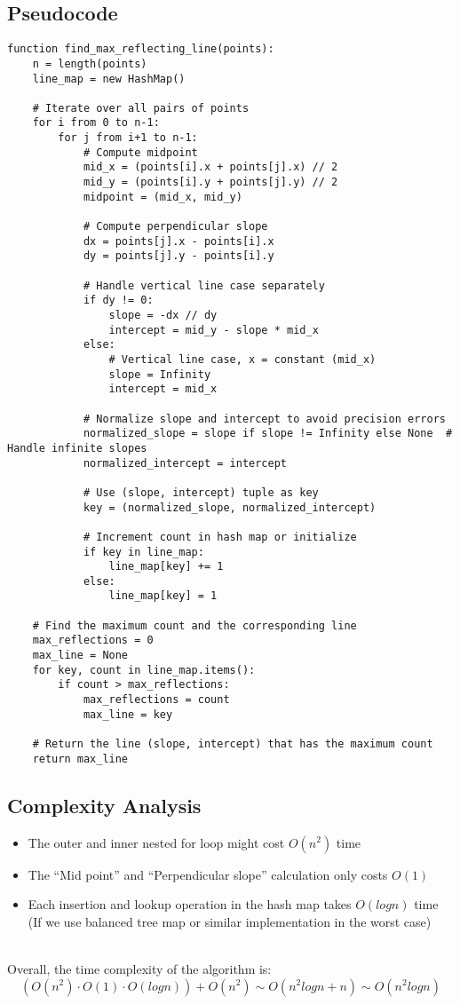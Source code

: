 \documentclass{article}
\begin{document}
\subsection*{Pseudocode}
\begin{verbatim}
function find_max_reflecting_line(points):
    n = length(points)
    line_map = new HashMap()

    # Iterate over all pairs of points
    for i from 0 to n-1:
        for j from i+1 to n-1:
            # Compute midpoint
            mid_x = (points[i].x + points[j].x) // 2
            mid_y = (points[i].y + points[j].y) // 2
            midpoint = (mid_x, mid_y)

            # Compute perpendicular slope
            dx = points[j].x - points[i].x
            dy = points[j].y - points[i].y

            # Handle vertical line case separately
            if dy != 0:
                slope = -dx // dy
                intercept = mid_y - slope * mid_x
            else:
                # Vertical line case, x = constant (mid_x)
                slope = Infinity
                intercept = mid_x

            # Normalize slope and intercept to avoid precision errors
            normalized_slope = slope if slope != Infinity else None  # Handle infinite slopes
            normalized_intercept = intercept

            # Use (slope, intercept) tuple as key
            key = (normalized_slope, normalized_intercept)

            # Increment count in hash map or initialize
            if key in line_map:
                line_map[key] += 1
            else:
                line_map[key] = 1

    # Find the maximum count and the corresponding line
    max_reflections = 0
    max_line = None
    for key, count in line_map.items():
        if count > max_reflections:
            max_reflections = count
            max_line = key

    # Return the line (slope, intercept) that has the maximum count
    return max_line
\end{verbatim}

\subsection*{Complexity Analysis}
\begin{itemize}
    \item The outer and inner nested for loop might cost $O(n^2)$ time 
    \item The ``Mid point'' and ``Perpendicular slope'' calculation only costs $O(1)$ 
    \item Each insertion and lookup operation in the hash map takes $O(logn)$ time (If we use balanced tree map or similar implementation in the worst case)
\end{itemize}
\\
Overall, the time complexity of the algorithm is:
\[ (O(n^2) \cdot O(1) \cdot O(logn)) + O(n^2) \sim O(n^2logn + n) \sim O(n^2logn) \]
\end{document}
